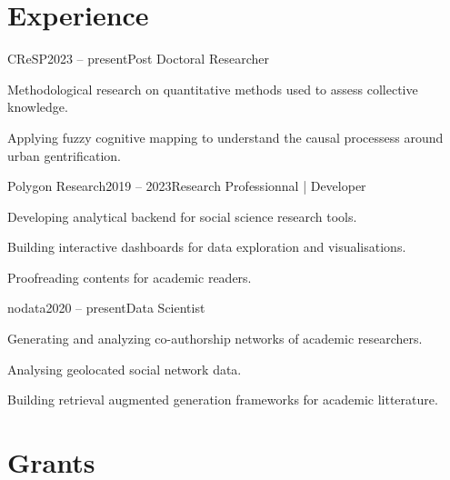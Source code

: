 \documentclass{resume}
\begin{document}
\section{Experience}
\begin{content}

    \begin{position}{CReSP}{2023 -- present}{Post Doctoral Researcher}{}{}
    \item Methodological research on quantitative methods used to assess collective knowledge.
    \item Applying fuzzy cognitive mapping to understand the causal processess around urban gentrification.
    \end{position}
    \vspace{-.1\baselineskip}

    \begin{position}{Polygon Research}{2019 -- 2023}{Research Professionnal | Developer}{}{}
    \item Developing analytical backend for social science research tools.
    \item Building interactive dashboards for data exploration and visualisations.
    \item Proofreading contents for academic readers.
    \end{position}
    
    \begin{position}{nodata}{2020 -- present}{Data Scientist}{}{}
    	\item Generating and analyzing co-authorship networks of academic researchers.
    	\item Analysing geolocated social network data.
    	\item Building retrieval augmented generation frameworks for academic litterature.
    \end{position}

\sectionlineskip
\end{content}
\vspace{-1\medskipamount}

\section{Grants} 
\begin{content}
\end{content}
\end{document}

